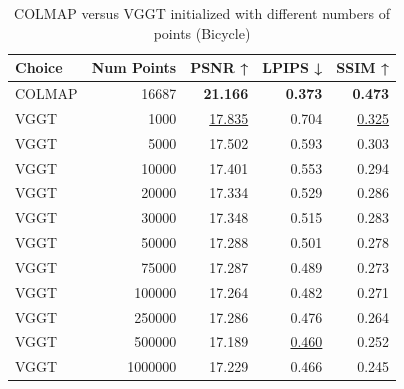 \begin{table}[H]
\caption{COLMAP versus VGGT initialized with different numbers of points (Bicycle)}
\label{tab:02_num_points_bicycle}
\begin{tabular}{lrrrr}
\toprule
Choice & Num Points & PSNR ↑ & LPIPS ↓ & SSIM ↑ \\
\midrule
COLMAP & 16687 & \textbf{21.166} & \textbf{0.373} & \textbf{0.473} \\
VGGT & 1000 & \underline{17.835} & 0.704 & \underline{0.325} \\
VGGT & 5000 & 17.502 & 0.593 & 0.303 \\
VGGT & 10000 & 17.401 & 0.553 & 0.294 \\
VGGT & 20000 & 17.334 & 0.529 & 0.286 \\
VGGT & 30000 & 17.348 & 0.515 & 0.283 \\
VGGT & 50000 & 17.288 & 0.501 & 0.278 \\
VGGT & 75000 & 17.287 & 0.489 & 0.273 \\
VGGT & 100000 & 17.264 & 0.482 & 0.271 \\
VGGT & 250000 & 17.286 & 0.476 & 0.264 \\
VGGT & 500000 & 17.189 & \underline{0.460} & 0.252 \\
VGGT & 1000000 & 17.229 & 0.466 & 0.245 \\
\bottomrule
\end{tabular}
\end{table}
